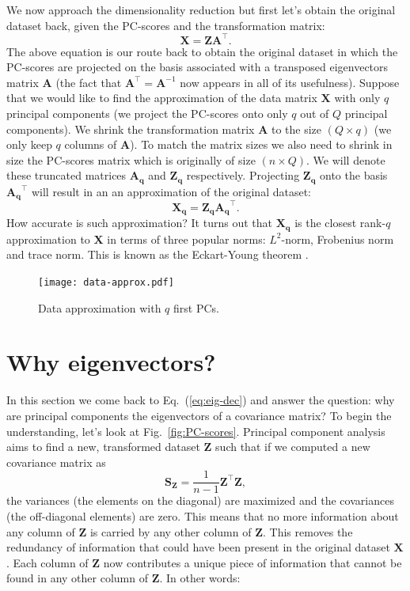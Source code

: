 \documentclass[10pt,twocolumn]{article}
\begin{document}
We now approach the dimensionality reduction but first let's obtain the original dataset back, given the PC-scores and the transformation matrix:
\begin{equation} \label{eq:X-retrieval}
\mathbf{X} = \mathbf{Z} \mathbf{A}^{\top}.
\end{equation}
The above equation is our route back to obtain the original dataset in which the PC-scores are projected on the basis associated with a transposed eigenvectors matrix $\mathbf{A}$ (the fact that $\mathbf{A}^{\top} = \mathbf{A}^{-1}$ now appears in all  of its usefulness).
Suppose that we would like to find the approximation of the data matrix $\mathbf{X}$ with only $q$ principal components (we project the PC-scores onto only $q$ out of $Q$ principal components).
We shrink the transformation matrix $\mathbf{A}$ to the size $(Q \times q)$ (we only keep $q$ columns of $\mathbf{A}$). To match the matrix sizes we also need to shrink in size the PC-scores matrix which is originally of size $(n \times Q)$. We will denote these truncated matrices $\mathbf{A_q}$ and $\mathbf{Z_q}$ respectively.
Projecting $\mathbf{Z_q}$ onto the basis $\mathbf{A_q}^{\top}$ will result in an an approximation of the original dataset:
\begin{equation} \label{eq:X-approximation}
\mathbf{X_q} = \mathbf{Z_q} \mathbf{A_q}^{\top}.
\end{equation}
How accurate is such approximation? It turns out that $\mathbf{X_q}$ is the closest rank-$q$ approximation to $\mathbf{X}$ in terms of three popular norms: $L^2$-norm, Frobenius norm and trace norm. This is known as the Eckart-Young theorem \cite{eckart-young}.
\begin{figure}[t]
\centering\texttt{[image: data-approx.pdf]}
\caption{Data approximation with $q$ first PCs.}
\label{fig:data-approx}
\end{figure}

\section{Why eigenvectors?}

In this section we come back to Eq.~(\ref{eq:eig-dec}) and answer the question: why are principal components the eigenvectors of a covariance matrix? 
To begin the understanding, let's look at Fig.~\ref{fig:PC-scores}. Principal component analysis aims to find a new, transformed dataset $\mathbf{Z}$ such that if we computed a new covariance matrix as
\begin{equation}
\mathbf{S_Z} =  \frac{1}{n-1} \mathbf{Z}^{\top} \mathbf{Z},
\end{equation}
the variances (the elements on the diagonal) are maximized and the covariances (the off-diagonal elements) are zero. This means that no more information about any column of $\mathbf{Z}$ is carried by any other column of $\mathbf{Z}$. This removes the redundancy of information that could have been present in the original dataset $\mathbf{X}$. Each column of $\mathbf{Z}$ now contributes a unique piece of information that cannot be found in any other column of $\mathbf{Z}$. In other words:
\end{document}
